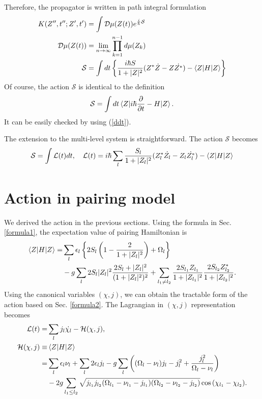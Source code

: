 \documentclass[11pt]{book} %
\begin{document}
Therefore, the propagator is written in path integral formulation
\begin{align}
    K(Z'',t'';Z',t') &= \int \mathcal{D}\mu(Z(t))e^{\frac{i}{\hbar}\mathcal{S}} \\
     \mathcal{D}\mu(Z(t)) &= \lim_{n \to \infty} \prod_{k=1}^{n-1}d\mu(Z_k) \\
    \mathcal{S} &= \int dt \left\{ \frac{i\hbar S}{1+|Z|^2}(Z^*\dot{Z}-Z\dot{Z^*})
    -\braket{Z|H|Z} \right\}
\end{align}
Of course, the action $\mathcal{S}$ is identical to the definition
\begin{align}
  \mathcal{S} = \int dt \braket{Z|i\hbar\frac{\partial}{\partial t}-H|Z} .
\end{align}
It can be easily checked by using (\ref{ddt}).

The extension to the multi-level system is straightforward. The action $\mathcal{S}$ becomes
\begin{equation}
  \mathcal{S} = \int \mathcal{L}(t) dt, \quad 
  \mathcal{L}(t) =i\hbar \sum_l \frac{S_l}{1+|Z_l|^2}
  (Z_l^*\dot{Z_l}-Z_l\dot{Z_l^*}) - \braket{Z|H|Z}
\end{equation}

\section{Action in pairing model}
We derived the action in the previous sections. Using the formula in Sec. \ref{formula1}, the expectation value of pairing Hamiltonian is
\begin{align}
  \braket{Z|H|Z} =& \sum_l \epsilon_l \left\{ 2S_l\left( 1-\frac{2}{1+|Z_l|^2} \right) + \Omega_l \right\} \nonumber \\
   &- g\sum_l 2S_l|Z_l|^2\frac{2S_l+|Z_l|^2}{(1+|Z_l|^2)^2}
    + \sum_{l_1 \neq l_2} \frac{2S_{l_1}Z_{l_1}}{1+|Z_{l_1}|^2}\frac{2S_{l_2}Z_{l_2}^*}{1+|Z_{l_2}|^2} .
\end{align}
Using the canonical variables $(\chi,j)$, we can obtain the tractable form of the action based on Sec. \ref{formula2}. 
The Lagrangian in $(\chi,j)$ representation becomes
\begin{align}
	\mathcal{L}(t) =& \sum_l j_l\dot{\chi_l} - \mathcal{H}(\chi,j) ,\\
	\mathcal{H}(\chi,j) \equiv& \braket{Z|H|Z} \nonumber \\
	=& \sum_l \epsilon_l\nu_l + \sum_l 2\epsilon_lj_l - g\sum_l \left( (\Omega_l-\nu_l) j_l - j_l^2 +\frac{j_l^2}{\Omega_l-\nu_l} \right) \nonumber \\
	&- 2g\sum_{l_1\le l_2} \sqrt{j_{l_1}j_{l_2}(\Omega_{l_1}-\nu_{l_1}-j_{l_1})(\Omega_{l_2}-\nu_{l_2}-j_{l_2})}\cos{(\chi_{l_1}-\chi_{l_2})}   .
\end{align}
\end{document}
